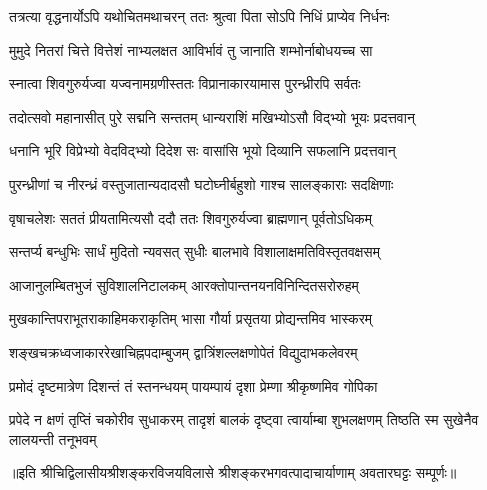 \twolineshloka
{तत्रत्या वृद्धनार्योऽपि यथोचितमथाचरन्}
{ततः श्रुत्वा पिता सोऽपि निधिं प्राप्येव निर्धनः} %

\twolineshloka
{मुमुदे नितरां चित्ते वित्तेशं नाभ्यलक्षत}
{आविर्भावं तु जानाति शम्भोर्नाबोधयच्च सा} %

\twolineshloka
{स्नात्वा शिवगुरुर्यज्वा यज्वनामग्रणीस्ततः}
{विप्रानाकारयामास पुरन्ध्रीरपि सर्वतः} %

\twolineshloka
{तदोत्सवो महानासीत् पुरे सद्मनि सन्ततम्}
{धान्यराशिं मखिभ्योऽसौ विद्भ्यो भूयः प्रदत्तवान्} %

\twolineshloka
{धनानि भूरि विप्रेभ्यो वेदविद्भ्यो दिदेश सः}
{वासांसि भूयो दिव्यानि सफलानि प्रदत्तवान्} %

\twolineshloka
{पुरन्ध्रीणां च नीरन्ध्रं वस्तुजातान्यदादसौ}
{घटोघ्नीर्बहुशो गाश्च सालङ्काराः सदक्षिणाः} %

\twolineshloka
{वृषाचलेशः सततं प्रीयतामित्यसौ ददौ}
{ततः शिवगुरुर्यज्वा ब्राह्मणान् पूर्वतोऽधिकम्} %

\twolineshloka
{सन्तर्प्य बन्धुभिः सार्धं मुदितो न्यवसत् सुधीः}
{बालभावे विशालाक्षमतिविस्तृतवक्षसम्} %

\twolineshloka
{आजानुलम्बितभुजं सुविशालनिटालकम्}
{आरक्तोपान्तनयनविनिन्दितसरोरुहम्} %

\twolineshloka
{मुखकान्तिपराभूतराकाहिमकराकृतिम्}
{भासा गौर्या प्रसृतया प्रोद्यन्तमिव भास्करम्} %

\twolineshloka
{शङ्खचक्रध्वजाकाररेखाचिह्नपदाम्बुजम्}
{द्वात्रिंशल्लक्षणोपेतं विद्युदाभकलेवरम्} %

\twolineshloka
{प्रमोदं दृष्टमात्रेण दिशन्तं तं स्तनन्धयम्}
{पायम्पायं दृशा प्रेम्णा श्रीकृष्णमिव गोपिका} %


\threelineshloka
{प्रपेदे न क्षणं तृप्तिं चकोरीव सुधाकरम्}
{तादृशं बालकं दृष्ट्वा त्वार्याम्बा शुभलक्षणम्}
{तिष्ठति स्म सुखेनैव लालयन्ती तनूभवम्} %


॥इति श्रीचिद्विलासीयश्रीशङ्करविजयविलासे श्री\-शङ्कर\-भगवत्पादा\-चार्या\-णाम् अवतार\-घट्टः सम्पूर्णः॥